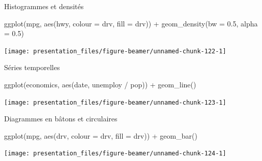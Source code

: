 \documentclass[12pt,handout,ignorenonframetext,]{beamer}
\newenvironment{Shaded}{}{}
\newcommand{\KeywordTok}[1]{\textcolor[rgb]{0.00,0.00,1.00}{#1}}
\newcommand{\DataTypeTok}[1]{#1}
\newcommand{\FloatTok}[1]{#1}
\newcommand{\StringTok}[1]{\textcolor[rgb]{0.00,0.50,0.50}{#1}}
\newcommand{\OperatorTok}[1]{#1}
\newcommand{\NormalTok}[1]{#1}
\renewenvironment{Shaded}{\begin{snugshade}}{\end{snugshade}}
\begin{document}
\begin{frame}[fragile]{Histogrammes et densités}

\footnotesize \center

\begin{Shaded}
\begin{Highlighting}[]
\KeywordTok{ggplot}\NormalTok{(mpg, }\KeywordTok{aes}\NormalTok{(hwy, }\DataTypeTok{colour =}\NormalTok{ drv, }\DataTypeTok{fill =}\NormalTok{ drv)) }\OperatorTok{+}\StringTok{ }
\StringTok{  }\KeywordTok{geom_density}\NormalTok{(}\DataTypeTok{bw =} \FloatTok{0.5}\NormalTok{, }\DataTypeTok{alpha =} \FloatTok{0.5}\NormalTok{)}
\end{Highlighting}
\end{Shaded}

\texttt{[image: presentation\_files/figure-beamer/unnamed-chunk-122-1]}

\end{frame}

\begin{frame}[fragile]{Séries temporelles}

\footnotesize \center

\begin{Shaded}
\begin{Highlighting}[]
\KeywordTok{ggplot}\NormalTok{(economics, }\KeywordTok{aes}\NormalTok{(date, unemploy }\OperatorTok{/}\StringTok{ }\NormalTok{pop)) }\OperatorTok{+}
\StringTok{  }\KeywordTok{geom_line}\NormalTok{()}
\end{Highlighting}
\end{Shaded}

\texttt{[image: presentation\_files/figure-beamer/unnamed-chunk-123-1]}

\end{frame}

\begin{frame}[fragile]{Diagrammes en bâtons et circulaires}

\footnotesize \center

\begin{Shaded}
\begin{Highlighting}[]
\KeywordTok{ggplot}\NormalTok{(mpg, }\KeywordTok{aes}\NormalTok{(drv, }\DataTypeTok{colour =}\NormalTok{ drv, }\DataTypeTok{fill =}\NormalTok{ drv)) }\OperatorTok{+}\StringTok{ }
\StringTok{  }\KeywordTok{geom_bar}\NormalTok{()}
\end{Highlighting}
\end{Shaded}

\texttt{[image: presentation\_files/figure-beamer/unnamed-chunk-124-1]}

\end{frame}
\end{document}
